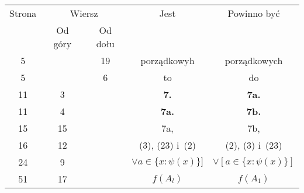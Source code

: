 \documentclass[a4paper,11pt]{article}
\begin{document}
\begin{center}

  \begin{tabular}{|c|c|c|c|c|}
    \hline
    Strona & \multicolumn{2}{c|}{Wiersz} & Jest
                              & Powinno być \\ \cline{2-3}
    & Od góry & Od dołu & & \\
    \hline
    5   & & 19 & porządkowyh & porządkowych \\
    5   & &  6 & to & do \\
    11  &  3 & & \textbf{7.} & \textbf{7a.} \\
    11  &  4 & & \textbf{7a.} & \textbf{7b.} \\
    15  & 15 & & 7a, & 7b, \\
    16  & 12 & & (3), (23) i~(2) & (2), (3) i~(23) \\
    24  &  9 & & $\lor a \in \{ x : \psi( x ) \} ]$ & $\lor [ a \in \{ x : \psi( x ) \} ]$ \\
    51  & 17 & & $f( A_{ l } )$ & $f( A_{ 1 } )$ \\
    \hline
  \end{tabular}






\end{center}
\end{document}

